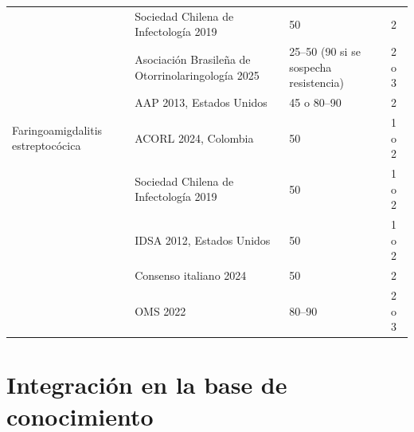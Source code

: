 \documentclass[10pt,a4paper]{article}
\begin{document}
{\begin{longtable}{@{}L{3.0cm}L{6.1cm}L{3.6cm}L{2.4cm}@{}}
& Sociedad Chilena de Infectología 2019~\citep{chilers2019} & 50 & 2 \\
& Asociación Brasileña de Otorrinolaringología 2025~\citep{brasilrs2025} & 25--50 (90 si se sospecha resistencia) & 2 o 3 \\
& AAP 2013, Estados Unidos~\citep{wald2013} & 45 o 80--90 & 2 \\
\midrule
Faringoamigdalitis estreptocócica & ACORL 2024, Colombia~\citep{acorlfaa2024} & 50 & 1 o 2 \\
& Sociedad Chilena de Infectología 2019~\citep{chilefaa2019} & 50 & 1 o 2 \\
& IDSA 2012, Estados Unidos~\citep{shulman2012} & 50 & 1 o 2 \\
& Consenso italiano 2024~\citep{chiappini2024} & 50 & 2 \\
& OMS 2022~\citep{aware2022} & 80--90 & 2 o 3 \\
\end{longtable}
}

\section{Integración en la base de conocimiento}
\end{document}
